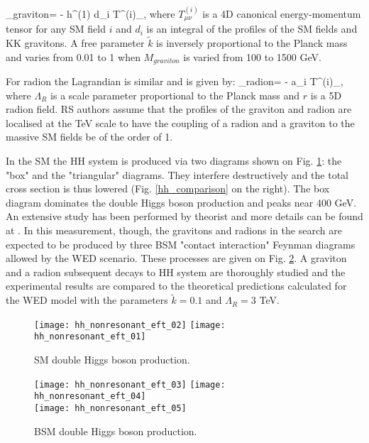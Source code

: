 \beqn\label{lagr_graviton}
\Lagr_{graviton}=  -  h^{\mu\nu(1)} \times d_i T^{(i)}_{\mu\nu},  
\eeqn
where $T^{(i)}_{\mu\nu}$ is a 4D canonical energy-momentum tensor \cite{Forger:2003ut} for any SM field $i$ and $d_i$ is an integral of the profiles of the SM fields and KK gravitons. A free parameter $\tilde{k}$ is inversely proportional to the Planck mass and varies from 0.01 to 1 when $M_{graviton}$ is varied from 100 to 1500 GeV. 

For radion the Lagrandian is similar and is given by:
\beqn\label{lagr_radion}
\Lagr_{radion}=  -  \times a_i T^{\mu (i)}_{\mu},  
\eeqn
where $\Lambda_R$ is a scale parameter proportional to the Planck mass and $r$ is a 5D radion field. RS authors assume that the profiles of the graviton and radion are localised at the TeV scale to have the coupling of a radion and a graviton to the massive SM fields be of the order of 1. 




In the SM the HH system is produced via two diagrams shown on Fig. \ref{SM_HH}: the "box" and the "triangular" diagrams. They interfere destructively and the total cross section is thus lowered (Fig. \ref{hh_comparison} on the right). The box diagram dominates the double Higgs boson production and peaks near 400 GeV. An extensive study has been performed by theorist and more details can be found at \cite{Chen:2014xra}. In this measurement, though, the gravitons and radions in the search are expected to be produced by three BSM "contact interaction" Feynman diagrams allowed by the WED scenario. These processes are given on Fig. \ref{BSM_HH}.  A graviton and a radion subsequent decays to HH system are thoroughly studied and the experimental results are compared to the theoretical predictions calculated for the WED model with the parameters $\tilde{k}=0.1$ and $\Lambda_R = 3 $ TeV.  




\begin{figure}[H]
  \centering
    \texttt{[image: hh\_nonresonant\_eft\_02]}
     \texttt{[image: hh\_nonresonant\_eft\_01]}
    \caption{SM double Higgs boson production.}
    \label{SM_HH}
\end{figure}


\begin{figure}[H]
  \centering
    \texttt{[image: hh\_nonresonant\_eft\_03]}
    \texttt{[image: hh\_nonresonant\_eft\_04]}\\
     \texttt{[image: hh\_nonresonant\_eft\_05]}
    \caption{BSM double Higgs boson production.}
    \label{BSM_HH}
\end{figure}



